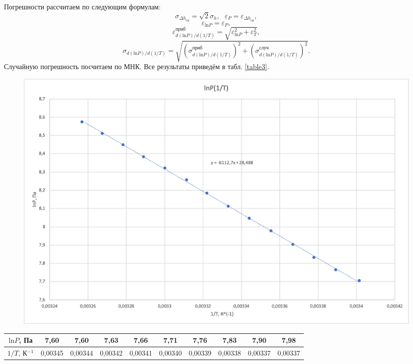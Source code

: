 \documentclass[a4paper, 12pt]{article}
\begin{document}
\begin{enumerate}
        Погрешности рассчитаем по следующим формулам:
        \begin{equation}
            \sigma_{\Delta h_{ср}} = \sqrt{2} \sigma_h, \text{ } \varepsilon_P = \varepsilon_{\Delta h_{ср}},
        \end{equation}
        \begin{equation}
            \varepsilon_{\text{ln}P} = \varepsilon_P,
        \end{equation}
        \begin{equation}
            \varepsilon_{d(\text{ln}P)/d(1/T)}^{приб} = \sqrt{\varepsilon_{\text{ln}P}^2 + \varepsilon_{T}^2},
        \end{equation}
        \begin{equation}
            \sigma_{d(\text{ln}P)/d(1/T)} = \sqrt{(\sigma_{d(\text{ln}P)/d(1/T)}^{приб})^2 + (\sigma_{d(\text{ln}P)/d(1/T)}^{случ})^2}.
        \end{equation}
        Случайную погрешность посчитаем по МНК. Все результаты приведём в табл. \ref{table3}. \\
        
        \begin{figure}[ht]
            \centering
            \includegraphics[width=0.75\linewidth]{images/lnP(1:T).png}
        \end{figure}
        
        \begin{table}[ht]
            \centering
            
            \begin{tabular}{|c|c|c|c|c|c|c|c|c|c|}
                \hline
                $\text{ln}P$, Па & 7,60 & 7,60 & 7,63 & 7,66 & 7,71 & 7,76 & 7,83 & 7,90 & 7,98 \\   
                \hline
                $1/T$, К$^{-1}$ & 0,00345 & 0,00344 & 0,00342 & 0,00341 & 0,00340 & 0,00339 & 0,00338 & 0,00337 & 0,00337 \\
                \hline
            \end{tabular}
            

\end{table}
\end{enumerate}
\end{document}
